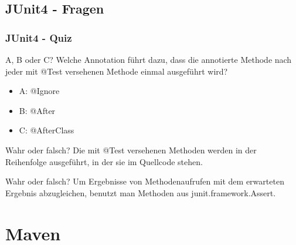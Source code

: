 \documentclass[18pt]{beamer}
\begin{document}
	\subsection{JUnit4 - Fragen}
	\begin{frame}
		\frametitle{JUnit4 - Quiz}
		\begin{block}{A, B oder C?}
			Welche Annotation führt dazu, dass die annotierte Methode nach jeder mit @Test versehenen Methode einmal ausgeführt wird?
			\begin{itemize}
				\item A: @Ignore
				\item B: @After
				\item C: @AfterClass
			\end{itemize}
		\end{block}
		\pause
		\begin{block}{Wahr oder falsch?}
			Die mit @Test versehenen Methoden werden in der Reihenfolge ausgeführt, in der sie im Quellcode stehen.
		\end{block}
		\pause
		\begin{block}{Wahr oder falsch?}
			Um Ergebnisse von Methodenaufrufen mit dem erwarteten Ergebnis abzugleichen, benutzt man Methoden aus junit.framework.Assert.
		\end{block}
	\end{frame}
		
\section{Maven}
\end{document}
